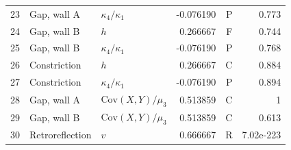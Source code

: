 {\begin{longtable}{rllrrr}
23 & Gap, wall A & $\kappa_4/\kappa_1$ & -0.076190 & P & 0.773\\
24 & Gap, wall B & $h$ & 0.266667 & F & 0.744\\
25 & Gap, wall B & $\kappa_4/\kappa_1$ & -0.076190 & P & 0.768\\
26 & Constriction & $h$ & 0.266667 & C & 0.884\\
27 & Constriction & $\kappa_4/\kappa_1$ & -0.076190 & P & 0.894\\
28 & Gap, wall A & $\mathrm{Cov}(X,Y)/\mu_3$ & 0.513859 & C & 1\\
29 & Gap, wall B & $\mathrm{Cov}(X,Y)/\mu_3$ & 0.513859 & C & 0.613\\
30 & Retroreflection & $v$ & 0.666667 & R & 7.02e-223\\
\end{longtable}}
